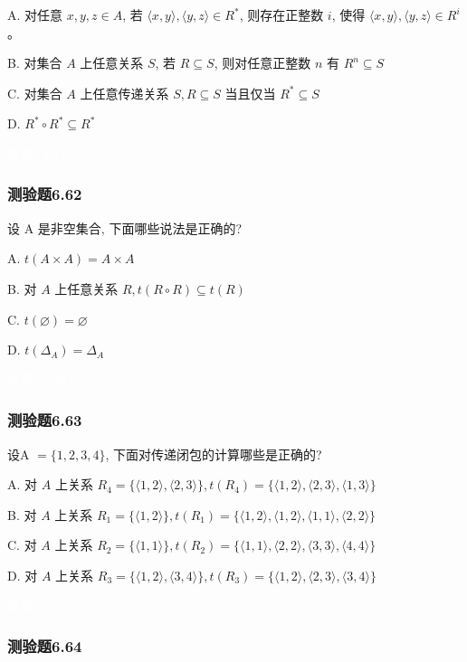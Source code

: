 \documentclass[UTF8, heading=true]{ctexart}
\begin{document}
A. 对任意 $x, y, z \in A$, 若 $\langle x, y\rangle,\langle y, z\rangle \in R^*$, 则存在正整数 $i$, 使得 $\langle x, y\rangle,\langle y, z\rangle \in R^i$ 。

B. 对集合 $A$ 上任意关系 $S$, 若 $R \subseteq S$, 则对任意正整数 $n$ 有 $R^n \subseteq S$

C. 对集合 $A$ 上任意传递关系 $S, R \subseteq S$ 当且仅当 $R^* \subseteq S$

D. $R^* \circ R^* \subseteq R^*$

\textcolor{white}{答案：CD}


\subsubsection{测验题6.62}
设 A 是非空集合, 下面哪些说法是正确的?

A. $t(A \times A)=A \times A$

B. 对 $A$ 上任意关系 $R, t(R \circ R) \subseteq t(R)$

C. $t(\varnothing)=\varnothing$

D. $t\left(\Delta_A\right)=\Delta_A$

\textcolor{white}{答案：ABCD}

\subsubsection{测验题6.63}

设A $=\{1,2,3,4\}$, 下面对传递闭包的计算哪些是正确的?

A. 对 $A$ 上关系 $R_4=\{\langle 1,2\rangle,\langle 2,3\rangle\}, t\left(R_4\right)=\{\langle 1,2\rangle,\langle 2,3\rangle,\langle 1,3\rangle\}$

B. 对 $A$ 上关系 $R_1=\{\langle 1,2\rangle\}, t\left(R_1\right)=\{\langle 1,2\rangle,\langle 1,2\rangle,\langle 1,1\rangle,\langle 2,2\rangle\}$

C. 对 $A$ 上关系 $R_2=\{\langle 1,1\rangle\}, t\left(R_2\right)=\{\langle 1,1\rangle,\langle 2,2\rangle,\langle 3,3\rangle,\langle 4,4\rangle\}$

D. 对 $A$ 上关系 $R_3=\{\langle 1,2\rangle,\langle 3,4\rangle\}, t\left(R_3\right)=\{\langle 1,2\rangle,\langle 2,3\rangle,\langle 3,4\rangle\}$

\textcolor{white}{答案：A}

\subsubsection{测验题6.64}
\end{document}
